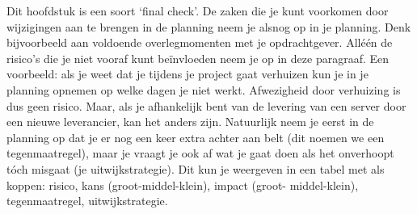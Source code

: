 Dit hoofdstuk is een soort ‘final check’. De zaken die je kunt voorkomen door wijzigingen aan te brengen in de planning neem je alsnog op in je planning. Denk bijvoorbeeld aan voldoende overlegmomenten met je opdrachtgever. Alléén de risico’s die je niet vooraf kunt beïnvloeden neem je op in deze paragraaf. Een voorbeeld: als je weet dat je tijdens je project gaat verhuizen kun je in je planning opnemen op welke dagen je niet werkt. Afwezigheid door verhuizing is dus geen risico. Maar, als je afhankelijk bent van de levering van een server door een nieuwe leverancier, kan het anders zijn. Natuurlijk neem je eerst in de planning op dat je er nog een keer extra achter aan belt (dit noemen we een tegenmaatregel), maar je vraagt je ook af wat je gaat doen als het onverhoopt tóch misgaat (je uitwijkstrategie).
Dit kun je weergeven in een tabel met als koppen: risico, kans (groot-middel-klein), impact (groot- middel-klein), tegenmaatregel, uitwijkstrategie.